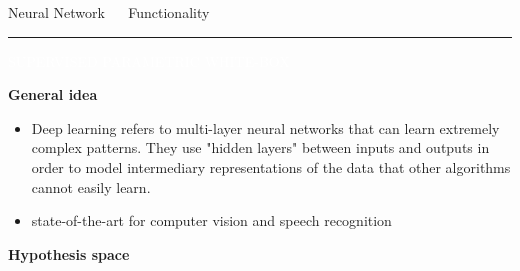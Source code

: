 \documentclass[11pt,compress,t,notes=noshow, xcolor=table]{beamer}
\begin{document}
\LARGE
\begin{frame}{\textcolor{gray!80}{Neural Network} ~~ Functionality}
\normalsize
\vspace{-0.5cm}
\noindent \textcolor{gray!80}{\rule{\textwidth}{1pt}}

\vspace{0.3cm}

\footnotesize

\colorbox{gray!80}{\textcolor{white}{SUPERVISED}}
\colorbox{gray!80}{\textcolor{white}{PARAMETRIC}}
\colorbox{gray!80}{\textcolor{white}{WHITE-BOX}}

\medskip

\textbf{\textcolor{gray!80}{General idea}} ~~
\begin{itemize}

\item Deep learning refers to multi-layer neural networks that can learn extremely complex patterns. They use "hidden layers" between inputs and outputs in order to model intermediary representations of the data that other algorithms cannot easily learn.
\item state-of-the-art for computer vision and speech recognition

\end{itemize}

\medskip

\textbf{\textcolor{gray!80}{Hypothesis space}} ~~

\medskip
\centering

\end{frame}

\end{document}
